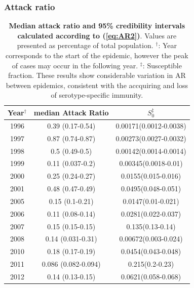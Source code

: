 \documentclass[10pt,compress,notheorems]{beamer}
\begin{document}
\begin{frame}
\frametitle{Attack ratio}
\begin{table}[!ht]
\begin{tiny}\caption{
{\bf Median attack ratio and 95\% credibility intervals calculated according to 
(\ref{eq:AR2})}. 
Values are presented as percentage of total population. 
$^\dag$: Year corresponds to the start of the epidemic, however the peak of 
cases
may occur in the following year.
$^\ddag$: Susceptible fraction.
These results show considerable variation in AR between epidemics, consistent 
with
the accquiring and loss of serotype-specific immunity.}                          
                             \end{tiny}
\begin{center}
\begin{footnotesize}\begin{tabular}{c|c|c}
\hline
Year$^\dag$ & median Attack Ratio & $S_0^\ddag$ \\
\hline
1996 & 0.39 (0.17-0.54) & 0.00171(0.0012-0.0038)\\
1997 & 0.87 (0.74-0.87) & 0.00273(0.0027-0.0032)\\
1998 & 0.5 (0.49-0.5) & 0.00142(0.0014-0.0014)\\
1999 & 0.11 (0.037-0.2) & 0.00345(0.0018-0.01)\\
2000 & 0.25 (0.24-0.27) & 0.0155(0.015-0.016)\\
2001 & 0.48 (0.47-0.49) & 0.0495(0.048-0.051)\\
2005 & 0.15 (0.1-0.21) & 0.0147(0.01-0.021)\\
2006 & 0.11 (0.08-0.14) & 0.0281(0.022-0.037)\\
2007 & 0.15 (0.15-0.15) & 0.135(0.13-0.14)\\
2008 & 0.14 (0.031-0.31) & 0.00672(0.003-0.024)\\
2010 & 0.18 (0.17-0.19) & 0.0454(0.043-0.048)\\
2011 & 0.086 (0.082-0.094) & 0.215(0.2-0.23)\\
2012 & 0.14 (0.13-0.15) & 0.0621(0.058-0.068)\\
\hline
\end{tabular}\end{footnotesize}
\end{center}
\label{tab:AR}
\end{table}
\end{frame}
\end{document}
